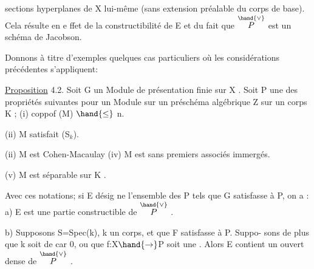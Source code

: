
sections hyperplanes de X lui-même (sans extension préalable du corps
de base). Cela résulte en e ffet de la constructibilité de E et du fait
que $\overset{\hand{\vee}}{P}$ est un schéma de Jacobson.

Donnons à titre d'exemples quelques cas particuliers où les
considérations précédentes s'appliquent:

\uline{Proposition} 4.2. Soit G un Module de présentation finie sur X .
Soit P une des propriétés suivantes pour un Module sur un préschéma
algébrique Z sur un corps K ;
(i) coppof (M) $\hand{\leq}$ n.

(ii) M satisfait (S$_{k}$).

(ii) M est Cohen-Macaulay
(iv) M est sans  premiers associés immergés.

(v) M est séparable sur  K .


 Avec ces notations; si E désig%
ne l'ensemble des \hand{$\xi\in$} P tels que G\hand{$_{\xi}$} satisfasse à P, on a :
a) E est une partie constructible de $\overset{\hand{\vee}}{P}$ .

b) Supposons S=Spec(k), k un corps, et que F satisfasse à P. Suppo-%
sons de plus  que k soit de car 0, ou que f:X$\hand{\rightarrow}$P soit une . 
Alors E contient un ouvert dense de $\overset{\hand{\vee}}{P}$ .

